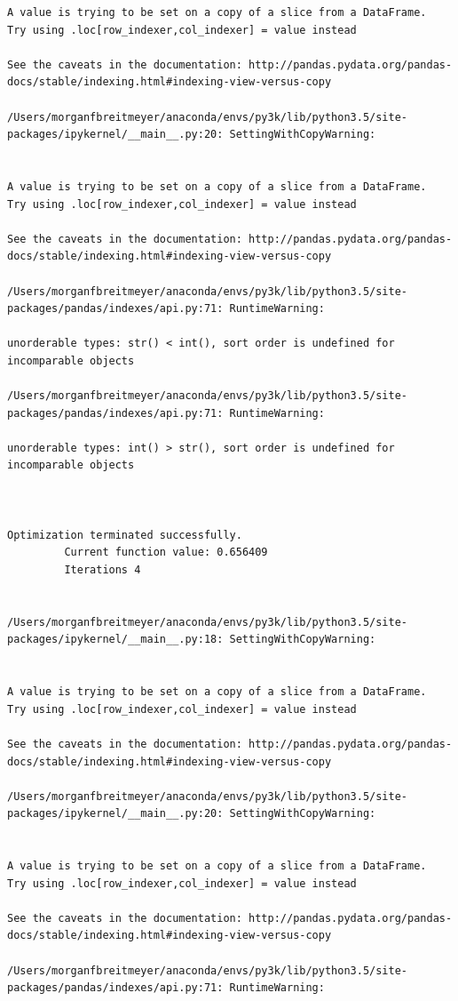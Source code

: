 \begin{lstlisting}
A value is trying to be set on a copy of a slice from a DataFrame.
Try using .loc[row_indexer,col_indexer] = value instead

See the caveats in the documentation: http://pandas.pydata.org/pandas-docs/stable/indexing.html#indexing-view-versus-copy

/Users/morganfbreitmeyer/anaconda/envs/py3k/lib/python3.5/site-packages/ipykernel/__main__.py:20: SettingWithCopyWarning:


A value is trying to be set on a copy of a slice from a DataFrame.
Try using .loc[row_indexer,col_indexer] = value instead

See the caveats in the documentation: http://pandas.pydata.org/pandas-docs/stable/indexing.html#indexing-view-versus-copy

/Users/morganfbreitmeyer/anaconda/envs/py3k/lib/python3.5/site-packages/pandas/indexes/api.py:71: RuntimeWarning:

unorderable types: str() < int(), sort order is undefined for incomparable objects

/Users/morganfbreitmeyer/anaconda/envs/py3k/lib/python3.5/site-packages/pandas/indexes/api.py:71: RuntimeWarning:

unorderable types: int() > str(), sort order is undefined for incomparable objects



Optimization terminated successfully.
         Current function value: 0.656409
         Iterations 4


/Users/morganfbreitmeyer/anaconda/envs/py3k/lib/python3.5/site-packages/ipykernel/__main__.py:18: SettingWithCopyWarning:


A value is trying to be set on a copy of a slice from a DataFrame.
Try using .loc[row_indexer,col_indexer] = value instead

See the caveats in the documentation: http://pandas.pydata.org/pandas-docs/stable/indexing.html#indexing-view-versus-copy

/Users/morganfbreitmeyer/anaconda/envs/py3k/lib/python3.5/site-packages/ipykernel/__main__.py:20: SettingWithCopyWarning:


A value is trying to be set on a copy of a slice from a DataFrame.
Try using .loc[row_indexer,col_indexer] = value instead

See the caveats in the documentation: http://pandas.pydata.org/pandas-docs/stable/indexing.html#indexing-view-versus-copy

/Users/morganfbreitmeyer/anaconda/envs/py3k/lib/python3.5/site-packages/pandas/indexes/api.py:71: RuntimeWarning:


\end{lstlisting}
